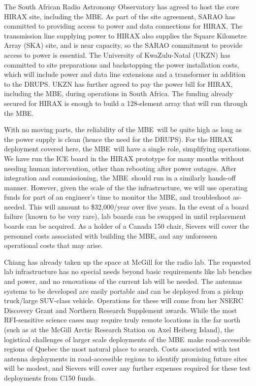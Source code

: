 \documentclass[letterpaper,11pt,preprint]{aastex}
\newcommand{\mbe}{{\rm MBE}}
\begin{document}
The South African Radio Astronomy Observatory has agreed to host the
core HIRAX site, including the \mbe.  As part of the site agreement,
SARAO has committed to providing access to power and data connections
for HIRAX.  The transmission line supplying power to HIRAX also
supplies the Square Kilometre Array (SKA) site, and is near capacity, so the SARAO commitment
to provide access to power is essential.  The University of
KwaZulu-Natal (UKZN) has committed to site preparations and
backstopping the power installation costs, which will include power
and data line extensions and a transformer in addition to the DRUPS.
UKZN has further agreed to pay the power bill for HIRAX, including the
\mbe, during operations in South Africa.  The funding already secured
for HIRAX is enough to build a 128-element array that will run through
the \mbe.

With no moving parts, the reliability of the \mbe\ will be quite high
as long as the power supply is clean (hence the need for the DRUPS).
For the HIRAX deployment covered here, the \mbe\ will have a single
role, simplifying operations.  We have run the ICE board in the HIRAX
prototype for many months without needing human intervention, other
than rebooting after power outages.  After integration and
commissioning, the \mbe\ should run in a similarly hands-off manner.
However, given the scale of the the infrastructure, we will use
operating funds for part of an engineer's time to monitor the \mbe,
and troubleshoot as-needed.  This will amount to \$32,000/year over
five years.  In the event of a board failure (known to
be very rare), lab boards can be swapped in until replacement boards
can be acquired.  As a holder of a Canada 150 chair, Sievers will
cover the personnel costs associated with building the \mbe, and any
unforeseen operational costs that may arise.

Chiang has already taken up the space at McGill for the radio lab.
The requested lab infrastructure has no special needs beyond basic
requirements like lab benches and power, and no renovations of the
current lab will be needed.  The antennas systems to be developed are
easily portable and can be deployed from a pickup truck/large
SUV-class vehicle.  {\color{red}Operations for these will come from
  her NSERC Discovery Grant and Northern Research Supplement awards.}
While the most RFI-sensitive science cases may require truly remote
locations in the far north (such as at the McGill Arctic Research
Station on Axel Heiberg Island), the logistical challenges of larger
scale deployments of the \mbe\ make road-accessible regions of Quebec
the most natural place to search.  Costs associated with test antenna
deployments in road-accessible regions to identify promising future
sites will be modest, and Sievers will cover any further expenses
required for these test deployments from C150 funds.
\end{document}

